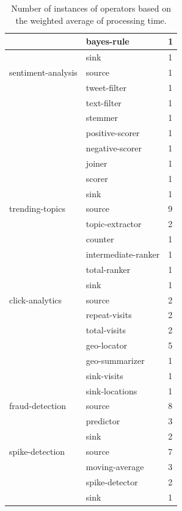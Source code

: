 \documentclass[ppgc,diss,english]{iiufrgs}
\begin{document}
\begin{table}[t]
\begin{center}
\begin{tabular}{ | l | l | l | }
	 & bayes-rule & 1 \\ \hline
	 & sink & 1 \\ \hline
	sentiment-analysis & source & 1 \\ \hline
	 & tweet-filter & 1 \\ \hline
	 & text-filter & 1 \\ \hline
	 & stemmer & 1 \\ \hline
	 & positive-scorer & 1 \\ \hline
	 & negative-scorer & 1 \\ \hline
	 & joiner & 1 \\ \hline
	 & scorer & 1 \\ \hline
	 & sink & 1 \\ \hline
	trending-topics & source & 9 \\ \hline
	 & topic-extractor & 2 \\ \hline
	 & counter & 1 \\ \hline
	 & intermediate-ranker & 1 \\ \hline
	 & total-ranker & 1 \\ \hline
	 & sink & 1 \\ \hline
	click-analytics & source & 2 \\ \hline
	 & repeat-visits & 2 \\ \hline
	 & total-visits & 2 \\ \hline
	 & geo-locator & 5 \\ \hline
	 & geo-summarizer & 1 \\ \hline
	 & sink-visits & 1 \\ \hline
	 & sink-locations & 1 \\ \hline
	fraud-detection & source & 8 \\ \hline
	 & predictor & 3 \\ \hline
	 & sink & 2 \\ \hline
	spike-detection & source & 7 \\ \hline
	 & moving-average & 3 \\ \hline
	 & spike-detector & 2 \\ \hline
	 & sink & 1 \\ \hline
\end{tabular}
	\caption[Number of instances of operators]{Number of instances of operators based on the weighted average of processing time.}
	\label{table:app_parallelism}
\end{center}
\end{table}

\end{document}
